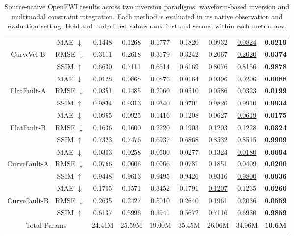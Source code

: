 \documentclass[letterpaper]{article}
\begin{document}
\begin{table}[t]
\begin{tabular*}{\textwidth}{@{\extracolsep{\fill}}c c c c c c c c c@{}}
		\addlinespace[2pt]
		& MAE $\downarrow$ & 0.1448 & 0.1268 & 0.1777 & 0.1820 & 0.0932 & \underline{0.0824} & \textbf{0.0219} \\
		CurveVel-B & RMSE $\downarrow$ & 0.3111 & 0.2618 & 0.3179 & 0.3242 & 0.2067 & \underline{0.2020} & \textbf{0.0374} \\
		& SSIM $\uparrow$ & 0.6630 & 0.7111 & 0.6614 & 0.6169 & 0.8076 & \underline{0.8156} & \textbf{0.9878} \\
		\midrule
		& MAE $\downarrow$ & \underline{0.0128} & 0.0868 & 0.0876 & 0.0164 & 0.0396 & 0.0206 & \textbf{0.0088} \\
		FlatFault-A & RMSE $\downarrow$ & 0.0351 & 0.1485 & 0.2060 & 0.0510 & 0.0586 & \underline{0.0323} & \textbf{0.0199} \\
		& SSIM $\uparrow$ & 0.9834 & 0.9313 & 0.9340 & 0.9701 & 0.9826 & \underline{0.9910} & \textbf{0.9934} \\
		\addlinespace[2pt]
		& MAE $\downarrow$ & 0.0965 & 0.0925 & 0.1416 & 0.1208 & 0.0627 & \underline{0.0619} & \textbf{0.0175} \\
		FlatFault-B & RMSE $\downarrow$ & 0.1636 & 0.1600 & 0.2220 & 0.1903 & \underline{0.1203} & 0.1228 & \textbf{0.0324} \\
		& SSIM $\uparrow$ & 0.7323 & 0.7476 & 0.6937 & 0.6868 & \underline{0.8532} & 0.8515 & \textbf{0.9909} \\
		\midrule
		& MAE $\downarrow$ & 0.0303 & 0.0258 & 0.0500 & 0.0277 & 0.1324 & \underline{0.0180} & \textbf{0.0094} \\
		CurveFault-A & RMSE $\downarrow$ & 0.0766 & 0.0606 & 0.0966 & 0.0781 & 0.1851 & \underline{0.0409} & \textbf{0.0200} \\
		& SSIM $\uparrow$ & 0.9448 & 0.9613 & 0.9495 & 0.9426 & 0.9316 & \underline{0.9800} & \textbf{0.9936} \\
		\addlinespace[2pt]
		& MAE $\downarrow$ & 0.1705 & 0.1571 & 0.3452 & 0.1791 & \underline{0.1207} & 0.1235 & \textbf{0.0260} \\
		CurveFault-B & RMSE $\downarrow$ & 0.2635 & 0.2427 & 0.5010 & 0.2640 & \underline{0.1961} & 0.2036 & \textbf{0.0559} \\
		& SSIM $\uparrow$ & 0.6137 & 0.5996 & 0.3941 & 0.5672 & \underline{0.7116} & 0.6930 & \textbf{0.9859} \\
		\midrule
		\multicolumn{2}{c}{Total Params} & 24.41M & 25.59M & 19.00M & 35.45M & 26.06M & 34.96M & \textbf{10.6M} \\
		\bottomrule
	\end{tabular*}
	\caption{Source-native OpenFWI results across two inversion paradigms: waveform-based inversion and multimodal constraint integration. Each method is evaluated in its native observation and evaluation setting. Bold and underlined values rank first and second within each metric row.}
	\label{tab:main-comparison}
\end{table}
\end{document}
